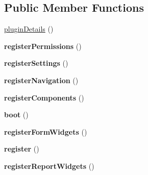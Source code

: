 \subsection*{Public Member Functions}
\begin{DoxyCompactItemize}
\item 
\hyperlink{classDMA_1_1Friends_1_1Plugin_abcae4983c18bdb7b266c6aaa7a081d68}{plugin\-Details} ()
\item 
\hypertarget{classDMA_1_1Friends_1_1Plugin_a1f5f007ec6f0f3f16516cf1a2e19d296}{{\bfseries register\-Permissions} ()}\label{classDMA_1_1Friends_1_1Plugin_a1f5f007ec6f0f3f16516cf1a2e19d296}

\item 
\hypertarget{classDMA_1_1Friends_1_1Plugin_ad494274bdd3480e4623b5fec196352b3}{{\bfseries register\-Settings} ()}\label{classDMA_1_1Friends_1_1Plugin_ad494274bdd3480e4623b5fec196352b3}

\item 
\hypertarget{classDMA_1_1Friends_1_1Plugin_aaca6d71040b99d2151b2760c93f3e61c}{{\bfseries register\-Navigation} ()}\label{classDMA_1_1Friends_1_1Plugin_aaca6d71040b99d2151b2760c93f3e61c}

\item 
\hypertarget{classDMA_1_1Friends_1_1Plugin_aba0ea6e404e36aaba19174560d3781ac}{{\bfseries register\-Components} ()}\label{classDMA_1_1Friends_1_1Plugin_aba0ea6e404e36aaba19174560d3781ac}

\item 
\hypertarget{classDMA_1_1Friends_1_1Plugin_a8ff526c557ed7081a1f4c04194994305}{{\bfseries boot} ()}\label{classDMA_1_1Friends_1_1Plugin_a8ff526c557ed7081a1f4c04194994305}

\item 
\hypertarget{classDMA_1_1Friends_1_1Plugin_a900bf22951ffe9e109d1c14afdd261d5}{{\bfseries register\-Form\-Widgets} ()}\label{classDMA_1_1Friends_1_1Plugin_a900bf22951ffe9e109d1c14afdd261d5}

\item 
\hypertarget{classDMA_1_1Friends_1_1Plugin_adfd39323d7e2724cdacdb41d590b32e2}{{\bfseries register} ()}\label{classDMA_1_1Friends_1_1Plugin_adfd39323d7e2724cdacdb41d590b32e2}

\item 
\hypertarget{classDMA_1_1Friends_1_1Plugin_af4c0877dc0c5067f527fa414bc70de57}{{\bfseries register\-Report\-Widgets} ()}\label{classDMA_1_1Friends_1_1Plugin_af4c0877dc0c5067f527fa414bc70de57}

\end{DoxyCompactItemize}


